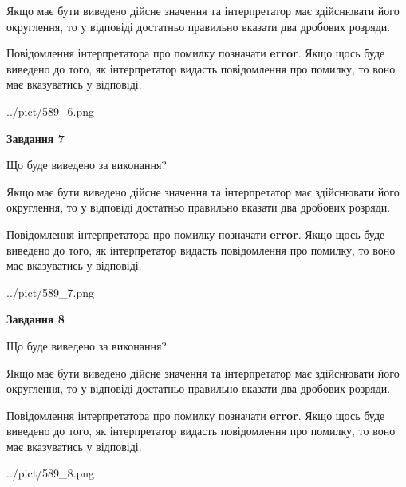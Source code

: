 \documentclass[12pt, ukrainian]{article}
\begin{document}
{\begin {Large}
Якщо має бути виведено дійсне значення та інтерпретатор має здійснювати його округлення, 
то у відповіді достатньо правильно вказати два дробових розряди.

Повідомлення інтерпретатора про помилку позначати \textbf{error}.
Якщо щось буде виведено до того, як інтерпретатор видасть повідомлення про помилку, 
то воно має вказуватись у відповіді. \par

\begin{center}
	{../pict/589_6.png}
\end{center}
\newpage

{\begin {center}\textbf{Завдання 7}\end {center}}\par
Що буде виведено за виконання? \par

Якщо має бути виведено дійсне значення та інтерпретатор має здійснювати його округлення, 
то у відповіді достатньо правильно вказати два дробових розряди.

Повідомлення інтерпретатора про помилку позначати \textbf{error}.
Якщо щось буде виведено до того, як інтерпретатор видасть повідомлення про помилку, 
то воно має вказуватись у відповіді. \par

\begin{center}
	{../pict/589_7.png}
\end{center}
\newpage

{\begin {center}\textbf{Завдання 8}\end {center}}\par
Що буде виведено за виконання? \par

Якщо має бути виведено дійсне значення та інтерпретатор має здійснювати його округлення, 
то у відповіді достатньо правильно вказати два дробових розряди.

Повідомлення інтерпретатора про помилку позначати \textbf{error}.
Якщо щось буде виведено до того, як інтерпретатор видасть повідомлення про помилку, 
то воно має вказуватись у відповіді. \par

\begin{center}
	{../pict/589_8.png}
\end{center}
\newpage


\end{Large}}
\end{document}
